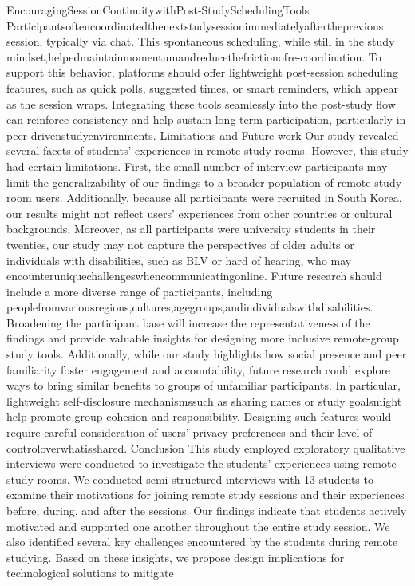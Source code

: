 \documentclass[12pt]{ctexart}
\begin{document}
EncouragingSessionContinuitywithPost-StudySchedulingTools
Participantsoftencoordinatedthenextstudysessionimmediatelyaftertheprevious
session, typically via chat. This spontaneous scheduling, while still in the study
mindset,helpedmaintainmomentumandreducethefrictionofre-coordination. To
support this behavior, platforms should offer lightweight post-session scheduling
features, such as quick polls, suggested times, or smart reminders, which appear
as the session wraps. Integrating these tools seamlessly into the post-study flow
can reinforce consistency and help sustain long-term participation, particularly in
peer-drivenstudyenvironments.
Limitations and Future work
Our study revealed several facets of students’ experiences in remote study rooms.
However, this study had certain limitations. First, the small number of interview
participants may limit the generalizability of our findings to a broader population
of remote study room users. Additionally, because all participants were recruited
in South Korea, our results might not reflect users’ experiences from other
countries or cultural backgrounds. Moreover, as all participants were university
students in their twenties, our study may not capture the perspectives of older
adults or individuals with disabilities, such as BLV or hard of hearing, who may
encounteruniquechallengeswhencommunicatingonline.
Future research should include a more diverse range of participants, including
peoplefromvariousregions,cultures,agegroups,andindividualswithdisabilities.
Broadening the participant base will increase the representativeness of the findings
and provide valuable insights for designing more inclusive remote-group study
tools. Additionally, while our study highlights how social presence and peer
familiarity foster engagement and accountability, future research could explore
ways to bring similar benefits to groups of unfamiliar participants. In particular,
lightweight self-disclosure mechanismssuch as sharing names or study goalsmight
help promote group cohesion and responsibility. Designing such features would
require careful consideration of users’ privacy preferences and their level of
controloverwhatisshared.
Conclusion
This study employed exploratory qualitative interviews were conducted to
investigate the students’ experiences using remote study rooms. We conducted
semi-structured interviews with 13 students to examine their motivations for
joining remote study sessions and their experiences before, during, and after the
sessions. Our findings indicate that students actively motivated and supported one
another throughout the entire study session. We also identified several key
challenges encountered by the students during remote studying. Based on these
insights, we propose design implications for technological solutions to mitigate
\end{document}
